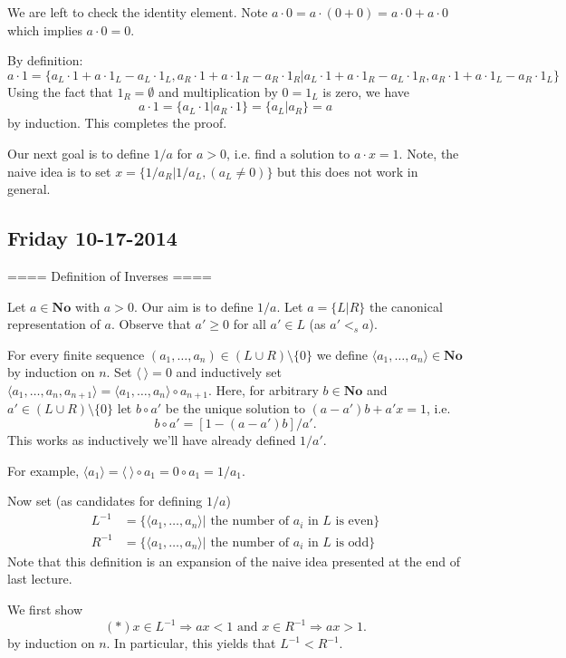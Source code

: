 We are left to check the identity element. Note $a\cdot 0 = a\cdot (0+0) = a\cdot 0 + a\cdot 0$ which implies $a\cdot 0 = 0$.

By definition:
\[
a\cdot 1 = \{a_L\cdot 1 + a\cdot 1_L - a_L\cdot 1_L, a_R\cdot 1 + a\cdot 1_R - a_R\cdot 1_R | a_L\cdot 1 + a \cdot 1_R - a_L\cdot 1_R, a_R \cdot 1 + a\cdot 1_L - a_R\cdot 1_L\}
\]
Using the fact that $1_R = \emptyset$ and multiplication by $0 = 1_L$ is zero, we have
\[
a\cdot 1 = \{a_L\cdot 1 | a_R \cdot 1\} = \{a_L | a_R\} = a
\]
by induction. This completes the proof.

Our next goal is to define $1/a$ for $a>0$, i.e. find a solution to $a\cdot x = 1$.
Note, the naive idea is to set $x = \{1/a_R | 1/a_L, (a_L\neq 0)\}$ but this does not work in general.

\subsection{ Friday 10-17-2014 }

==== Definition of Inverses ====

Let $a\in \mathbf{No}$ with $a>0$. Our aim is to define $1/a$. Let $a = \{L|R\}$ the canonical representation of $a$. Observe that $a'\geq 0$ for all $a'\in L$ (as $a' <_s a$).

For every finite sequence $(a_1,\ldots,a_n)\in (L\cup R)\setminus \{0\}$ we define $\langle a_1,\ldots, a_n\rangle \in \mathbf{No}$ by induction on $n$. Set $\langle \ \rangle = 0$ and inductively set $\langle a_1,\ldots, a_n, a_{n+1}\rangle = \langle a_1,\ldots, a_n \rangle \circ a_{n+1}$.
Here, for arbitrary $b\in \mathbf{No}$ and $a'\in (L\cup R)\setminus \{0\}$ let $b\circ a'$ be the unique solution to $(a-a')b + a'x = 1$, i.e.
\[
b\circ a' = [1-(a-a')b]/a'.
\]
This works as inductively we'll have already defined $1/a'$.

For example, $\langle a_1 \rangle = \langle \ \rangle \circ a_1 = 0 \circ a_1 = 1/a_1$.

Now set (as candidates for defining $1/a$)
\begin{align*}
L^{-1} &= \{ \langle a_1,\ldots, a_n \rangle | \text{ the number of } a_i \text{ in }L \text{ is even} \} \\
R^{-1} &= \{ \langle a_1,\ldots, a_n \rangle | \text{ the number of } a_i \text{ in }L \text{ is odd} \}
\end{align*}
Note that this definition is an expansion of the naive idea presented at the end of last lecture.

We first show
\[
(*) x \in L^{-1} \Rightarrow ax < 1 \text{ and } x\in R^{-1} \Rightarrow ax > 1.
\]
by induction on $n$. In particular, this yields that $L^{-1} < R^{-1}$.

